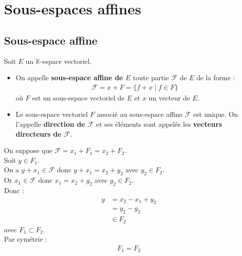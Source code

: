 \documentclass[../main.tex]{subfiles}
\begin{document}
\setcounter{chapter}{22}
\chapter{Sous-espaces affines}
\tableofcontents
\clearpage

\section{Sous-espace affine}
\begin{tcolorbox}[title=Définition, title filled=false, colframe=lightpurple, colback=lightpurple!10!white]
    Soit $E$ un $\mathbb{K}$-espace vectoriel. \\
    \begin{itemize}
        \item On appelle \textbf{sous-espace affine de $E$} toute partie $\mathcal{F}$ de $E$ de la forme : 
        \begin{align*}
            \mathcal{F} = x + F = \{f + x \mid f \in F\}
        \end{align*}
        où $F$ est un sous-espace vectoriel de $E$ et $x$ un vecteur de $E$. \\
        
        \item Le sous-espace vectoriel $F$ associé au sous-espace affine $\mathcal{F}$ est unique. On l'appelle \textbf{direction de $\mathcal{F}$} et ses éléments sont appelés les \textbf{vecteurs directeurs de $\mathcal{F}$}. 
    \end{itemize}
\end{tcolorbox}

\noindent On suppose que $\mathcal{F} = x_1 + F_1 = x_2 + F_2$. \\
Soit $y\in F_1$. \\
On a $y + x_1 \in \mathcal{F}$ donc $y + x_1 = x_2 + y_2$ avec $y_2 \in F_2$. \\
Or $x_1 \in \mathcal{F}$ donc $x_1 = x_2 + g_2$ avec $g_2 \in F_2$. \\
Donc : 
\begin{align*}
    y &= x_2 - x_1 + y_2 \\
    &= y_2 - g_2 \\
    &\in F_2
\end{align*}
avec $F_1 \subset F_2$. \\
Par symétrie : 
\begin{align*}
    F_1 = F_2
\end{align*}

\end{document}
